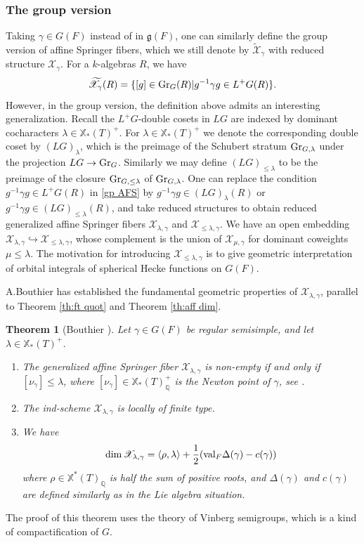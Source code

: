 \documentclass[]{pcmi}
\let\oldsubsubsection\subsubsection
\renewcommand{\subsubsection}[1]{%
\setcounter{subsubsection}{\value{equation}}%
\oldsubsubsection{#1}%
\refstepcounter{equation}%
}
\theoremstyle{plain}
\newtheorem{theorem}[equation]{Theorem}
\theoremstyle{definition}
\def\QQ{\mathbb{Q}}
\newcommand{\sX}{\ensuremath{\mathscr{X}}\xspace}
\newcommand{\sX}{\ensuremath{\mathcal{X}}\xspace}
\newcommand\frg{\mathfrak{g}}
\newcommand{\Gr}{\textup{Gr}}
\newcommand{\val}{\textup{val}}
\newcommand\xch{\mathbb{X}^*}
\newcommand\xcoch{\mathbb{X}_*}
\newcommand{\incl}{\hookrightarrow}
\renewcommand{\l}{\lambda}
\newcommand{\jiao}[1]{\langle{#1}\rangle}
\newcommand{\wt}{\widetilde}
\newcommand{\tX}{\wt{\sX}}
\begin{document}
\subsubsection{The group version} Taking $\gamma\in G(F)$ instead of in $\frg(F)$, one can similarly define the group version of  affine Springer fibers, which we still denote by $\tX_{\gamma}$ with reduced structure $\sX_{\gamma}$. For a $k$-algebras $R$, we have
\begin{equation}\label{gp AFS}
\tX_{\gamma}(R)=\{[g]\in \Gr_{G}(R)|g^{-1}\gamma g\in L^{+}G(R)\}.
\end{equation}
However, in the group version, the definition above admits an interesting generalization. Recall the $L^{+}G$-double cosets in $LG$ are indexed by dominant cocharacters $\l\in\xcoch(T)^{+}$. For $\l\in\xcoch(T)^{+}$ we denote the corresponding double coset by $(LG)_{\l}$, which is the preimage of the Schubert stratum $\Gr_{G,\l}$ under the projection $LG\to \Gr_{G}$. Similarly we may define $(LG)_{\leq \l}$ to be the preimage of the closure $\Gr_{G,\leq \l}$ of $\Gr_{G,\l}$. One can replace the condition $g^{-1}\gamma g\in L^{+}G(R)$ in \eqref{gp AFS} by $g^{-1}\gamma g\in (LG)_{\l}(R)$ or $g^{-1}\gamma g\in (LG)_{\leq\l}(R)$, and take reduced structures to obtain reduced generalized affine Springer fibers $\sX_{\l,\gamma}$ and $\sX_{\leq\l, \gamma}$. We have an open embedding $\sX_{\l,\gamma}\incl\sX_{\leq\l,\gamma}$, whose complement is the union of $\sX_{\mu,\gamma}$ for dominant coweights $\mu\leq\l$. The motivation for introducing $\sX_{\leq\l,\gamma}$ is to give geometric interpretation of orbital integrals of spherical Hecke functions on $G(F)$. 


A.Bouthier has established the fundamental geometric properties of $\sX_{\l,\gamma}$, parallel to Theorem \ref{th:ft quot} and Theorem \ref{th:aff dim}. 

\begin{theorem}[Bouthier \cite{Bouthier}]  Let $\gamma\in G(F)$ be regular semisimple, and let $\l\in\xcoch(T)^{+}$.
\begin{enumerate}
\item The generalized affine Springer fiber $\sX_{\l,\gamma}$ is non-empty if and only if $[\nu_{\gamma}]\leq\l$, where $[\nu_{\gamma}]\in\xcoch(T)^{+}_{\QQ}$ is the Newton point of $\gamma$, see \cite[\S2]{KV}.
\item The ind-scheme $\sX_{\l,\gamma}$ is locally of finite type.
\item We have
\begin{equation*}
\dim\sX_{\l,\gamma}=\jiao{\rho,\l}+\frac{1}{2}(\val_{F}\Delta(\gamma)-c(\gamma))
\end{equation*}
where $\rho\in\xch(T)_{\QQ}$ is half the sum of positive roots, and $\Delta(\gamma)$ and $c(\gamma)$ are defined similarly as in the Lie algebra situation.
\end{enumerate}
\end{theorem}
The proof of this theorem uses the theory of Vinberg semigroups, which is a kind of compactification of $G$.
\end{document}
